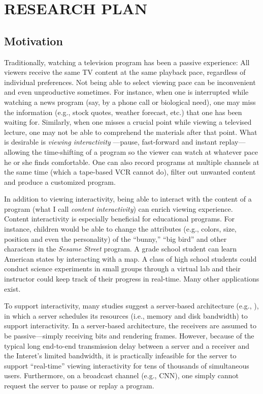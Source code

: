 \section{RESEARCH PLAN}
\subsection{Motivation}

Traditionally, watching a television program has been a passive experience:
All viewers receive the same TV content at the same
playback pace, regardless of individual preferences.
Not being able to select viewing pace 
can be inconvenient and even unproductive 
sometimes. For instance, when one
is interrupted while watching a news program
(say, by a phone call or biological need), one may 
miss the information (e.g., stock quotes, weather forecast,
etc.) that one has been waiting for.  Similarly, when
one misses a crucial point while viewing a televised
lecture, one may not be able to comprehend the materials
after that point.
What is desirable is {\em viewing interactivity}
---pause, fast-forward and instant replay---allowing
the time-shifting of a program so the viewer can
watch at whatever pace he or she finds comfortable.
One can also record programs at multiple channels at the same
time (which a tape-based VCR cannot do), filter out unwanted
content and produce a customized program. 

In addition to viewing interactivity, being able to 
interact with the content of a program (what I call
{\em content interactivity}) can enrich viewing experience.
Content interactivity is
especially beneficial for educational programs. For instance,
children would be able to change the attributes 
(e.g., colors, size, position 
and even the personality) of the ``bunny,'' ``big bird'' and
other characters in the {\it Sesame Street} program.
A grade school student can learn American states
by interacting with a map.
A class of high school students could conduct science experiments
in small groups through a virtual lab and their instructor
could keep track of their progress in real-time. 
Many other applications exist.

To support interactivity, many studies suggest a server-based
architecture (e.g., \cite{ex80,ex49,ex54,ex1,ex86}),
in which a server schedules
its resources (i.e., memory and disk bandwidth)
to support interactivity.
In a server-based architecture, the receivers are assumed
to be passive---simply receiving bits and rendering frames.
However, because of the typical long end-to-end transmission
delay between a server and a receiver and the Interet's limited bandwidth,
it is practically infeasible for the server
to support ``real-time'' viewing interactivity for tens of
thousands of simultaneous users.  Furthermore,
on a broadcast channel (e.g., CNN), one simply cannot request
the server to pause or replay a program.
 
